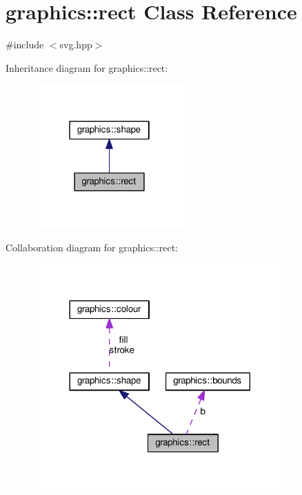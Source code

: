 \hypertarget{classgraphics_1_1rect}{}\section{graphics\+:\+:rect Class Reference}
\label{classgraphics_1_1rect}


{\ttfamily \#include $<$svg.\+hpp$>$}



Inheritance diagram for graphics\+:\+:rect\+:
\nopagebreak
\begin{figure}[H]
\begin{center}
\leavevmode
\includegraphics[width=166pt]{classgraphics_1_1rect__inherit__graph}
\end{center}
\end{figure}


Collaboration diagram for graphics\+:\+:rect\+:
\nopagebreak
\begin{figure}[H]
\begin{center}
\leavevmode
\includegraphics[width=276pt]{classgraphics_1_1rect__coll__graph}
\end{center}
\end{figure}
